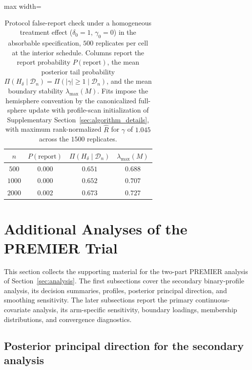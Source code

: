 \documentclass[11pt]{article}
\theoremstyle{definition}
\theoremstyle{plain}
\begin{document}
\begin{table}[!htbp]
  \centering
  \caption{Protocol false-report check under a homogeneous treatment effect ($\delta_0=1$, $\gamma_0=0$) in the absorbable specification, $500$ replicates per cell at the interior schedule. Columns report the report probability $P(\text{report})$, the mean posterior tail probability $\Pi(H_\delta\mid\mathcal D_n)=\Pi(|\gamma|\ge1\mid\mathcal D_n)$, and the mean boundary stability $\lambda_{\max}(M)$. Fits impose the hemisphere convention by the canonicalized full-sphere update with profile-scan initialization of Supplementary Section~\ref{sec:algorithm_details}, with maximum rank-normalized $\widehat R$ for $\gamma$ of $1.045$ across the $1500$ replicates.}
  \label{tab:sim_protocol_null}
  \begin{adjustbox}{max width=\textwidth}
  \begin{tabular}{cccc}
    \toprule
    $n$ & $P(\text{report})$ & $\Pi(H_\delta\mid\mathcal D_n)$ & $\lambda_{\max}(M)$\\
    \midrule
    $500$  & $0.000$ & $0.651$ & $0.688$\\
    $1000$ & $0.000$ & $0.652$ & $0.707$\\
    $2000$ & $0.002$ & $0.673$ & $0.727$\\
    \bottomrule
  \end{tabular}
  \end{adjustbox}
\end{table}
\section{Additional Analyses of the PREMIER Trial}
\label{sec:additional_analysis_results}

This section collects the supporting material for the two-part PREMIER analysis of Section~\ref{sec:analysis}. The first subsections cover the secondary binary-profile analysis, its decision summaries, profiles, posterior principal direction, and smoothing sensitivity. The later subsections report the primary continuous-covariate analysis, its arm-specific sensitivity, boundary loadings, membership distributions, and convergence diagnostics.

\subsection{Posterior principal direction for the secondary analysis}
\end{document}
